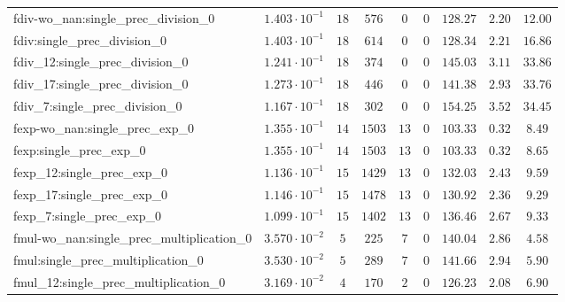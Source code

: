 \begin{tabular}{|l|c|c|c|c|c|c|c|c|}
fdiv-wo\_nan:single\_prec\_division\_0         & $ 1.403 \cdot 10^{-1} $ & $ 18     $ & $ 576    $ & $ 0   $ & $ 0   $ & $ 128.27      $ & $ 2.20    $ & $ 12.00   $ \\
fdiv:single\_prec\_division\_0                 & $ 1.403 \cdot 10^{-1} $ & $ 18     $ & $ 614    $ & $ 0   $ & $ 0   $ & $ 128.34      $ & $ 2.21    $ & $ 16.86   $ \\
fdiv\_12:single\_prec\_division\_0             & $ 1.241 \cdot 10^{-1} $ & $ 18     $ & $ 374    $ & $ 0   $ & $ 0   $ & $ 145.03      $ & $ 3.11    $ & $ 33.86   $ \\
fdiv\_17:single\_prec\_division\_0             & $ 1.273 \cdot 10^{-1} $ & $ 18     $ & $ 446    $ & $ 0   $ & $ 0   $ & $ 141.38      $ & $ 2.93    $ & $ 33.76   $ \\
fdiv\_7:single\_prec\_division\_0              & $ 1.167 \cdot 10^{-1} $ & $ 18     $ & $ 302    $ & $ 0   $ & $ 0   $ & $ 154.25      $ & $ 3.52    $ & $ 34.45   $ \\
fexp-wo\_nan:single\_prec\_exp\_0              & $ 1.355 \cdot 10^{-1} $ & $ 14     $ & $ 1503   $ & $ 13  $ & $ 0   $ & $ 103.33      $ & $ 0.32    $ & $ 8.49    $ \\
fexp:single\_prec\_exp\_0                      & $ 1.355 \cdot 10^{-1} $ & $ 14     $ & $ 1503   $ & $ 13  $ & $ 0   $ & $ 103.33      $ & $ 0.32    $ & $ 8.65    $ \\
fexp\_12:single\_prec\_exp\_0                  & $ 1.136 \cdot 10^{-1} $ & $ 15     $ & $ 1429   $ & $ 13  $ & $ 0   $ & $ 132.03      $ & $ 2.43    $ & $ 9.59    $ \\
fexp\_17:single\_prec\_exp\_0                  & $ 1.146 \cdot 10^{-1} $ & $ 15     $ & $ 1478   $ & $ 13  $ & $ 0   $ & $ 130.92      $ & $ 2.36    $ & $ 9.29    $ \\
fexp\_7:single\_prec\_exp\_0                   & $ 1.099 \cdot 10^{-1} $ & $ 15     $ & $ 1402   $ & $ 13  $ & $ 0   $ & $ 136.46      $ & $ 2.67    $ & $ 9.33    $ \\
fmul-wo\_nan:single\_prec\_multiplication\_0   & $ 3.570 \cdot 10^{-2} $ & $ 5      $ & $ 225    $ & $ 7   $ & $ 0   $ & $ 140.04      $ & $ 2.86    $ & $ 4.58    $ \\
fmul:single\_prec\_multiplication\_0           & $ 3.530 \cdot 10^{-2} $ & $ 5      $ & $ 289    $ & $ 7   $ & $ 0   $ & $ 141.66      $ & $ 2.94    $ & $ 5.90    $ \\
fmul\_12:single\_prec\_multiplication\_0       & $ 3.169 \cdot 10^{-2} $ & $ 4      $ & $ 170    $ & $ 2   $ & $ 0   $ & $ 126.23      $ & $ 2.08    $ & $ 6.90    $ \\

\end{tabular}

